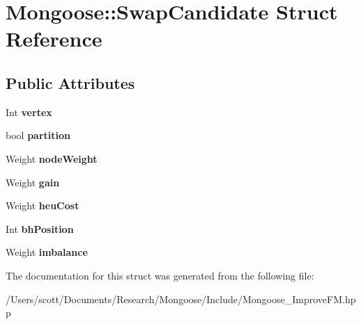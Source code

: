 \hypertarget{struct_mongoose_1_1_swap_candidate}{}\section{Mongoose\+:\+:Swap\+Candidate Struct Reference}
\label{struct_mongoose_1_1_swap_candidate}
\subsection*{Public Attributes}
\begin{DoxyCompactItemize}
\item 
\hypertarget{struct_mongoose_1_1_swap_candidate_a3e4079261821405a9da07c73698affbe}{}\label{struct_mongoose_1_1_swap_candidate_a3e4079261821405a9da07c73698affbe} 
Int {\bfseries vertex}
\item 
\hypertarget{struct_mongoose_1_1_swap_candidate_a90c6040412c04f4b8fd76431166bd20f}{}\label{struct_mongoose_1_1_swap_candidate_a90c6040412c04f4b8fd76431166bd20f} 
bool {\bfseries partition}
\item 
\hypertarget{struct_mongoose_1_1_swap_candidate_a1499c91e26791e8d128486bc7f8863ab}{}\label{struct_mongoose_1_1_swap_candidate_a1499c91e26791e8d128486bc7f8863ab} 
Weight {\bfseries node\+Weight}
\item 
\hypertarget{struct_mongoose_1_1_swap_candidate_aca751a5057599840508a0f7c502f7beb}{}\label{struct_mongoose_1_1_swap_candidate_aca751a5057599840508a0f7c502f7beb} 
Weight {\bfseries gain}
\item 
\hypertarget{struct_mongoose_1_1_swap_candidate_a27282802fd8e0d200f10361b4d2ec976}{}\label{struct_mongoose_1_1_swap_candidate_a27282802fd8e0d200f10361b4d2ec976} 
Weight {\bfseries heu\+Cost}
\item 
\hypertarget{struct_mongoose_1_1_swap_candidate_ac5719cdece2cfd40787060177e07e24e}{}\label{struct_mongoose_1_1_swap_candidate_ac5719cdece2cfd40787060177e07e24e} 
Int {\bfseries bh\+Position}
\item 
\hypertarget{struct_mongoose_1_1_swap_candidate_a83d2a65ccc8aa2806b152db6c9c4bd7e}{}\label{struct_mongoose_1_1_swap_candidate_a83d2a65ccc8aa2806b152db6c9c4bd7e} 
Weight {\bfseries imbalance}
\end{DoxyCompactItemize}


The documentation for this struct was generated from the following file\+:\begin{DoxyCompactItemize}
\item 
/\+Users/scott/\+Documents/\+Research/\+Mongoose/\+Include/Mongoose\+\_\+\+Improve\+F\+M.\+hpp\end{DoxyCompactItemize}
